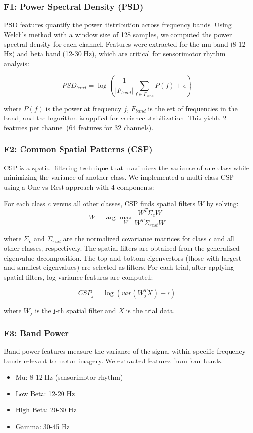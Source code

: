 \documentclass[conference]{IEEEtran}
\begin{document}
\subsubsection{F1: Power Spectral Density (PSD)}
PSD features quantify the power distribution across frequency bands. Using Welch's method with a window size of 128 samples, we computed the power spectral density for each channel. Features were extracted for the mu band (8-12 Hz) and beta band (12-30 Hz), which are critical for sensorimotor rhythm analysis:

\begin{equation}
PSD_{band} = \log\left(\frac{1}{|F_{band}|}\sum_{f \in F_{band}} P(f) + \epsilon\right)
\end{equation}

where $P(f)$ is the power at frequency $f$, $F_{band}$ is the set of frequencies in the band, and the logarithm is applied for variance stabilization. This yields 2 features per channel (64 features for 32 channels).

\subsubsection{F2: Common Spatial Patterns (CSP)}
CSP is a spatial filtering technique that maximizes the variance of one class while minimizing the variance of another class. We implemented a multi-class CSP using a One-vs-Rest approach with 4 components:

For each class $c$ versus all other classes, CSP finds spatial filters $W$ by solving:
\begin{equation}
W = \arg\max_W \frac{W^T \Sigma_c W}{W^T \Sigma_{rest} W}
\end{equation}

where $\Sigma_c$ and $\Sigma_{rest}$ are the normalized covariance matrices for class $c$ and all other classes, respectively. The spatial filters are obtained from the generalized eigenvalue decomposition. The top and bottom eigenvectors (those with largest and smallest eigenvalues) are selected as filters. For each trial, after applying spatial filters, log-variance features are computed:

\begin{equation}
CSP_j = \log\left(var(W_j^T X) + \epsilon\right)
\end{equation}

where $W_j$ is the j-th spatial filter and $X$ is the trial data.

\subsubsection{F3: Band Power}
Band power features measure the variance of the signal within specific frequency bands relevant to motor imagery. We extracted features from four bands:
\begin{itemize}
    \item Mu: 8-12 Hz (sensorimotor rhythm)
    \item Low Beta: 12-20 Hz
    \item High Beta: 20-30 Hz
    \item Gamma: 30-45 Hz
\end{itemize}
\end{document}
